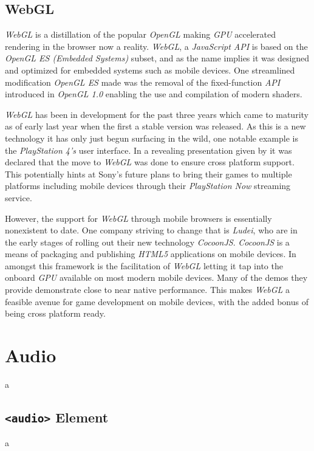 \documentclass[final]{cmpreport}
\begin{document}
\subsection{WebGL}
\textit{WebGL} is a distillation of the popular \textit{OpenGL} making \textit{GPU} accelerated rendering in the browser now a reality. \textit{WebGL}, a \textit{JavaScript API} is based on the \textit{OpenGL ES (Embedded Systems)} subset, and as the name implies it was designed and optimized for embedded systems such as mobile devices. One streamlined modification \textit{OpenGL ES} made was the removal of the fixed-function \textit{API} introduced in \textit{OpenGL 1.0} enabling the use and compilation of modern shaders.

\textit{WebGL} has been in development for the past three years which came to maturity as of early last year when the first a stable version was released. As this is a new technology it has only just begun surfacing in the wild, one notable example is the \textit{PlayStation 4's} user interface. In a revealing presentation given by \cite{Olmstead} it was declared that the move to \textit{WebGL} was done to ensure cross platform support. This potentially hints at Sony's future plans to bring their games to multiple platforms including mobile devices through their \textit{PlayStation Now} streaming service.

However, the support for \textit{WebGL} through mobile browsers is essentially nonexistent to date. One company striving to change that is \textit{Ludei}, who are in the early stages of rolling out their new technology \textit{CocoonJS}. \textit{CocoonJS} is a means of packaging and publishing \textit{HTML5} applications on mobile devices. In amongst this framework is the facilitation of \textit{WebGL} letting it tap into the onboard \textit{GPU} available on most modern mobile devices. Many of the demos they provide demonstrate close to near native performance. This makes \textit{WebGL} a feasible avenue for game development on mobile devices, with the added bonus of being cross platform ready.

\section{Audio}
a

\subsection{\texttt{<audio>} Element}
a
\end{document}
